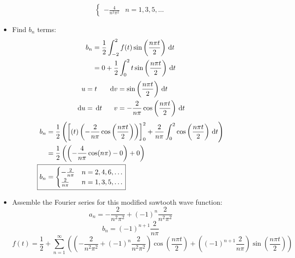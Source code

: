 \documentclass{article}
\begin{document}
\begin{itemize}
\begin{align*}
{{\begin{cases}
                -\frac{4}{n^2\pi^2} & n=1,3,5,\dots
            \end{cases}
        }}
    \end{align*}
    \item Find $b_n$ terms:
    \begin{align*}
        b_n &= \frac{1}{2}\int_{-2}^2 f(t)\sin\left( \frac{n\pi t}{2} \right)\, \text{d}t\\
        &= 0+\frac{1}{2}\int_0^2 t\sin\left( \frac{n\pi t}{2} \right)\, \text{d}t
    \end{align*}
    \begin{align*}
        u &= t&
            \, \text{d}v &= \sin\left( \frac{n\pi t}{2} \right)\, \text{d}t\\
        \, \text{d}u &= \, \text{d}t&
            v &= -\frac{2}{n\pi}\cos\left( \frac{n\pi t}{2} \right)\, \text{d}t
    \end{align*}
    \begin{align*}
        b_n &= \frac{1}{2}\left( \left[ (t)\left( -\frac{2}{n\pi}\cos\left( \frac{n\pi t}{2} \right) \right) \right]_0^2 + \frac{2}{n\pi}\int_0^2\cos\left( \frac{n\pi t}{2} \right)\D{t} \right)\\
        &= \frac{1}{2}\left( \left( -\frac{4}{n\pi}\cos(n\pi)-0 \right)+0 \right)\\
        \Aboxed{b_n &= {
            \begin{cases}
                -\frac{2}{n\pi} & n=2,4,6,\dots\\
                \frac{2}{n\pi} & n=1,3,5,\dots
            \end{cases}
        }}
    \end{align*}
    \item Assemble the Fourier series for this modified sawtooth wave function:
    \begin{equation*}
        a_n = -\frac{2}{n^2\pi^2}+(-1)^n\frac{2}{n^2\pi^2}
    \end{equation*}
    \begin{equation*}
        b_n = (-1)^{n+1}\frac{2}{n\pi}
    \end{equation*}
    \begin{equation*}
        f(t) = \frac{1}{2} + \sum_{n=1}^\infty \left( \left( -\frac{2}{n^2\pi^2}+(-1)^n\frac{2}{n^2\pi^2} \right)\cos\left( \frac{n\pi t}{2} \right)+\left( (-1)^{n+1}\frac{2}{n\pi} \right)\sin\left( \frac{n\pi t}{2} \right) \right)
    \end{equation*}
\end{itemize}
\end{document}
